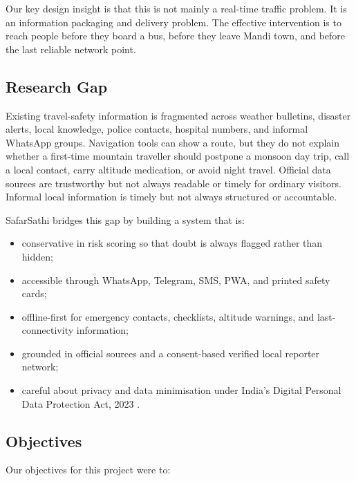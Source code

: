 \documentclass[12pt,a4paper]{article}
\begin{document}
Our key design insight is that this is not mainly a real-time traffic problem. It is an information packaging and delivery problem. The effective intervention is to reach people before they board a bus, before they leave Mandi town, and before the last reliable network point.

\subsection{Research Gap}

Existing travel-safety information is fragmented across weather bulletins, disaster alerts, local knowledge, police contacts, hospital numbers, and informal WhatsApp groups. Navigation tools can show a route, but they do not explain whether a first-time mountain traveller should postpone a monsoon day trip, call a local contact, carry altitude medication, or avoid night travel. Official data sources are trustworthy but not always readable or timely for ordinary visitors. Informal local information is timely but not always structured or accountable.

SafarSathi bridges this gap by building a system that is:

\begin{itemize}
  \item conservative in risk scoring so that doubt is always flagged rather than hidden;
  \item accessible through WhatsApp, Telegram, SMS, PWA, and printed safety cards;
  \item offline-first for emergency contacts, checklists, altitude warnings, and last-connectivity information;
  \item grounded in official sources and a consent-based verified local reporter network;
  \item careful about privacy and data minimisation under India's Digital Personal Data Protection Act, 2023 \cite{dpdp}.
\end{itemize}

\subsection{Objectives}

Our objectives for this project were to:
\end{document}
